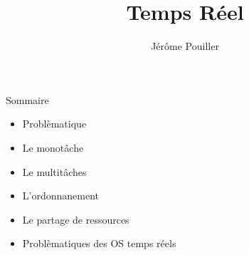 \documentclass[10pt,ucs,usepdftitle=false]{beamer}
\title{Temps Réel}
\author[J. Pouiller]{Jérôme Pouiller \email{j.pouiller@sysmic.org}}
\institute[Sysmic]{Sysmic}
\begin{document}
  \begin{frame}[plain]
    \maketitle
  \end{frame}

  \begin{frame}{Sommaire}
    \begin{itemize} 
    \item Problèmatique
    \item Le monotâche
    \item Le multitâches
    \item L'ordonnanement
    \item Le partage de ressources
    \item Problèmatiques des OS temps réels
    \end{itemize} 
  \end{frame}
  
  
  
  
  
  
  
\end{document}
